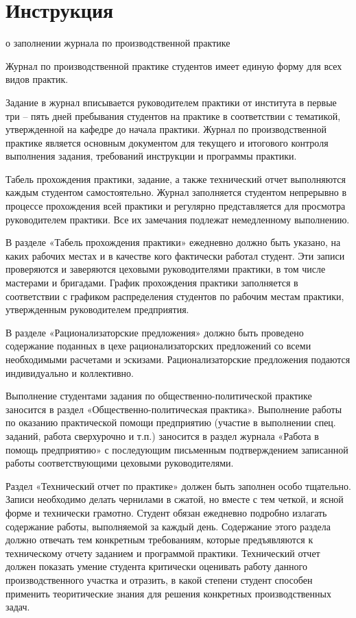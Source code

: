 \newpage
\section{Инструкция}

\begin{center}
	\large о заполнении журнала по производственной практике
\end{center}

Журнал по производственной практике студентов имеет единую форму для всех видов практик.

Задание в журнал вписывается руководителем практики от института в первые три – пять дней пребывания студентов на практике в соответствии с тематикой, утвержденной на кафедре до начала практики. Журнал по производственной практике является основным документом для текущего и итогового контроля выполнения задания, требований инструкции и программы практики.

Табель прохождения практики, задание, а также технический отчет выполняются каждым студентом самостоятельно.
Журнал заполняется студентом непрерывно в процессе прохождения всей практики и регулярно представляется для просмотра руководителем практики. Все их замечания подлежат немедленному выполнению.

В  разделе «Табель прохождения практики» ежедневно должно быть указано, на каких рабочих местах и в качестве кого фактически работал студент. Эти записи проверяются и заверяются цеховыми руководителями практики, в том числе мастерами и бригадами. График прохождения практики заполняется в соответствии с графиком распределения студентов по рабочим местам практики, утвержденным руководителем предприятия.

В разделе «Рационализаторские предложения» должно быть проведено содержание поданных в цехе рационализаторских предложений со всеми необходимыми расчетами и эскизами. Рационализаторские предложения подаются индивидуально и коллективно.

Выполнение студентами задания по общественно-политической практике заносится в раздел «Общественно-политическая практика». Выполнение работы по оказанию практической помощи предприятию (участие в выполнении спец. заданий, работа сверхурочно и т.п.) заносится в раздел журнала «Работа в помощь предприятию» с последующим письменным подтверждением записанной работы соответствующими цеховыми руководителями.

Раздел «Технический отчет по практике» должен быть заполнен особо тщательно. Записи необходимо делать чернилами в сжатой, но вместе с тем четкой, и ясной форме и технически грамотно. Студент обязан ежедневно подробно излагать содержание работы, выполняемой за каждый день. Содержание этого раздела должно отвечать тем конкретным требованиям, которые предъявляются к техническому отчету заданием и программой практики. Технический отчет должен показать умение студента критически оценивать работу данного производственного участка и отразить, в какой степени студент способен применить теоритические знания для решения конкретных производственных задач.

